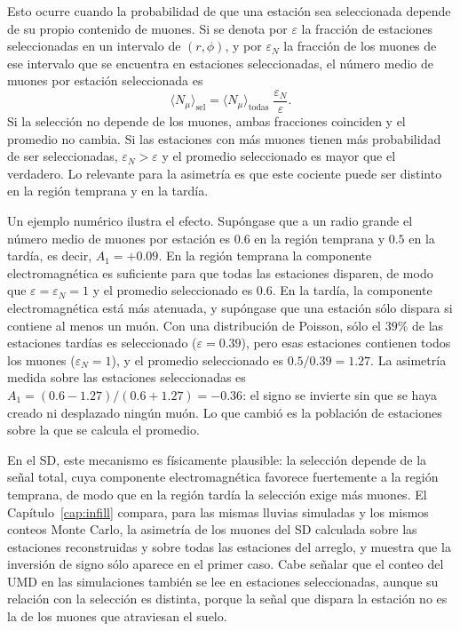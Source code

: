 Esto ocurre cuando la probabilidad de que una estación sea seleccionada depende de su propio contenido de muones. Si se denota por $\varepsilon$ la fracción de estaciones seleccionadas en un intervalo de $(r,\phi)$, y por $\varepsilon_N$ la fracción de los muones de ese intervalo que se encuentra en estaciones seleccionadas, el número medio de muones por estación seleccionada es
\begin{equation}
	\langle N_\mu \rangle_{\text{sel}} = \langle N_\mu \rangle_{\text{todas}}\;\frac{\varepsilon_N}{\varepsilon}.
	\label{eq:seleccion}
\end{equation}
Si la selección no depende de los muones, ambas fracciones coinciden y el promedio no cambia. Si las estaciones con más muones tienen más probabilidad de ser seleccionadas, $\varepsilon_N > \varepsilon$ y el promedio seleccionado es mayor que el verdadero. Lo relevante para la asimetría es que este cociente puede ser distinto en la región temprana y en la tardía.

Un ejemplo numérico ilustra el efecto. Supóngase que a un radio grande el número medio de muones por estación es $0.6$ en la región temprana y $0.5$ en la tardía, es decir, $A_1 = +0.09$. En la región temprana la componente electromagnética es suficiente para que todas las estaciones disparen, de modo que $\varepsilon = \varepsilon_N = 1$ y el promedio seleccionado es $0.6$. En la tardía, la componente electromagnética está más atenuada, y supóngase que una estación sólo dispara si contiene al menos un muón. Con una distribución de Poisson, sólo el $39\%$ de las estaciones tardías es seleccionado ($\varepsilon=0.39$), pero esas estaciones contienen todos los muones ($\varepsilon_N=1$), y el promedio seleccionado es $0.5/0.39 = 1.27$. La asimetría medida sobre las estaciones seleccionadas es $A_1 = (0.6-1.27)/(0.6+1.27) = -0.36$: el signo se invierte sin que se haya creado ni desplazado ningún muón. Lo que cambió es la población de estaciones sobre la que se calcula el promedio.

En el SD, este mecanismo es físicamente plausible: la selección depende de la señal total, cuya componente electromagnética favorece fuertemente a la región temprana, de modo que en la región tardía la selección exige más muones. El Capítulo~\ref{cap:infill} compara, para las mismas lluvias simuladas y los mismos conteos Monte Carlo, la asimetría de los muones del SD calculada sobre las estaciones reconstruidas y sobre todas las estaciones del arreglo, y muestra que la inversión de signo sólo aparece en el primer caso. Cabe señalar que el conteo del UMD en las simulaciones también se lee en estaciones seleccionadas, aunque su relación con la selección es distinta, porque la señal que dispara la estación no es la de los muones que atraviesan el suelo.


